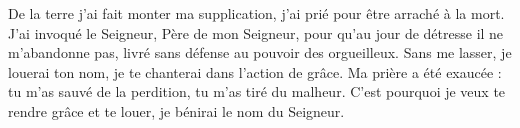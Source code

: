 De la terre j’ai fait monter ma supplication,
	j’ai prié pour être arraché à la mort.
J’ai invoqué le Seigneur, Père de mon Seigneur,
	pour qu’au jour de détresse il ne m’abandonne pas,
	livré sans défense au pouvoir des orgueilleux.
Sans me lasser, je louerai ton nom,
	je te chanterai dans l’action de grâce.
Ma prière a été exaucée :
	tu m’as sauvé de la perdition, tu m’as tiré du malheur.
C’est pourquoi je veux te rendre grâce et te louer,
	je bénirai le nom du Seigneur.

